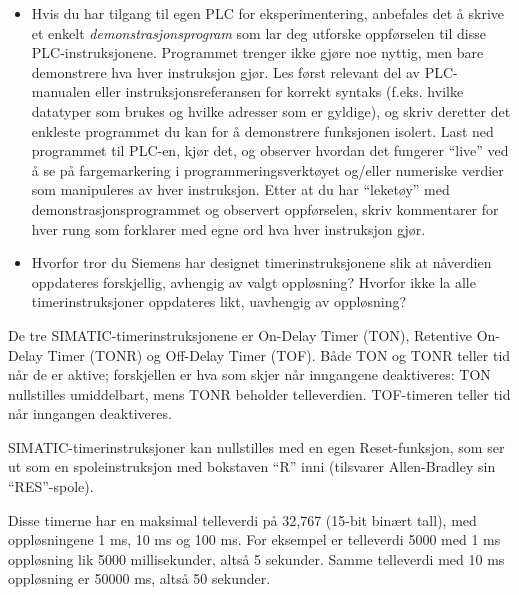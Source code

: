 \begin{itemize}
\item{} Hvis du har tilgang til egen PLC for eksperimentering, anbefales det å skrive et enkelt \textit{demonstrasjonsprogram} som lar deg utforske oppførselen til disse PLC-instruksjonene.  Programmet trenger ikke gjøre noe nyttig, men bare demonstrere hva hver instruksjon gjør.  Les først relevant del av PLC-manualen eller instruksjonsreferansen for korrekt syntaks (f.eks. hvilke datatyper som brukes og hvilke adresser som er gyldige), og skriv deretter det enkleste programmet du kan for å demonstrere funksjonen isolert.  Last ned programmet til PLC-en, kjør det, og observer hvordan det fungerer ``live'' ved å se på fargemarkering i programmeringsverktøyet og/eller numeriske verdier som manipuleres av hver instruksjon.  Etter at du har ``leketøy'' med demonstrasjonsprogrammet og observert oppførselen, skriv kommentarer for hver rung som forklarer med egne ord hva hver instruksjon gjør.
\item{} Hvorfor tror du Siemens har designet timerinstruksjonene slik at nåverdien oppdateres forskjellig, avhengig av valgt oppløsning?  Hvorfor ikke la alle timerinstruksjoner oppdateres likt, uavhengig av oppløsning?
\end{itemize}














De tre SIMATIC-timerinstruksjonene er On-Delay Timer (TON), Retentive On-Delay Timer (TONR) og Off-Delay Timer (TOF).  Både TON og TONR teller tid når de er aktive; forskjellen er hva som skjer når inngangene deaktiveres: TON nullstilles umiddelbart, mens TONR beholder telleverdien.  TOF-timeren teller tid når inngangen deaktiveres.

SIMATIC-timerinstruksjoner kan nullstilles med en egen Reset-funksjon, som ser ut som en spoleinstruksjon med bokstaven ``R'' inni (tilsvarer Allen-Bradley sin ``RES''-spole).

\vskip 10pt

Disse timerne har en maksimal telleverdi på 32,767 (15-bit binært tall), med oppløsningene 1 ms, 10 ms og 100 ms.  For eksempel er telleverdi 5000 med 1 ms oppløsning lik 5000 millisekunder, altså 5 sekunder.  Samme telleverdi med 10 ms oppløsning er 50000 ms, altså 50 sekunder.

